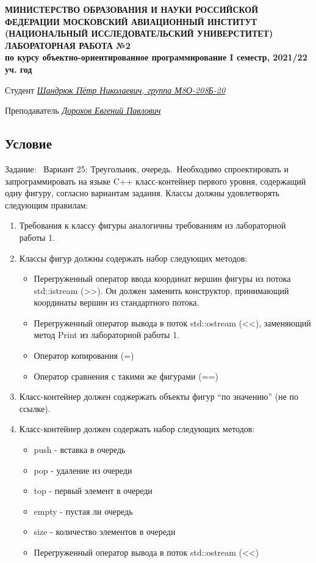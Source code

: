 \documentclass[12pt]{article}
\begin{document}
\begin{titlepage}
\begin{center}
\textbf{МИНИСТЕРСТВО ОБРАЗОВАНИЯ И НАУКИ РОССИЙСКОЙ ФЕДЕРАЦИИ
\medskip
МОСКОВСКИЙ АВИАЦИОННЫЙ ИНСТИТУТ
(НАЦИОНАЛЬНЫЙ ИССЛЕДОВАТЕЛЬСКИЙ УНИВЕРСТИТЕТ)
\vfill\vfill
{\Huge ЛАБОРАТОРНАЯ РАБОТА №2} \\
по курсу объектно-ориентированное программирование
I семестр, 2021/22 уч. год}
\end{center}
\vfill

Студент \uline{\it {Шандрюк Пётр Николаевич, группа М8О-208Б-20}\hfill}

Преподаватель \uline{\it {Дорохов Евгений Павлович}\hfill}

\vfill
\end{titlepage}

\subsection*{Условие}

Задание: \
Вариант 25: Треугольник, очередь.\
Необходимо спроектировать и запрограммировать на языке C++ класс-контейнер первого уровня, содержащий одну фигуру, согласно вариантам задания. Классы должны удовлетворять следующим правилам:
\begin{enumerate}
\item Требования к классу фигуры аналогичны требованиям из лабораторной работы 1.
\item Классы фигур должны содержать набор следующих методов:
\begin{itemize}
    \item Перегруженный оператор ввода координат вершин фигуры из потока std::istream (>>). Он должен заменить конструктор, принимающий координаты вершин из стандартного потока.
    \item Перегруженный оператор вывода в поток std::ostream (<<), заменяющий метод Print из лабораторной работы 1. 
    \item Оператор копирования (=)
    \item Оператор сравнения с такими же фигурами (==)
\end{itemize}
\item Класс-контейнер должен соджержать объекты фигур “по значению” (не по ссылке).
\item Класс-контейнер должен содержать набор следующих методов:
\begin{itemize}
	\item push - вставка в очередь
	\item pop - удаление из очереди
	\item top - первый элемент в очереди
	\item empty - пустая ли очередь
	\item size - количество элементов в очереди
	\item Перегруженный оператор вывода в поток std::ostream (<<)
\end{itemize}
\end{enumerate}
\end{document}
